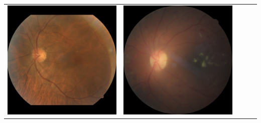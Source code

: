 \documentclass{beamer}
\begin{document}
\begin{frame}
\begin{tabular}{|C{0.2\textwidth}|C{0.2\textwidth}|C{0.2\textwidth}|C{0.2\textwidth}|C{0.2\textwidth}|}
	\includegraphics[width=\linewidth]{pics/197_left_0.jpg} &
	\includegraphics[width=\linewidth]{pics/257_left_2.jpg} &

\end{tabular}
\end{frame}
\end{document}
